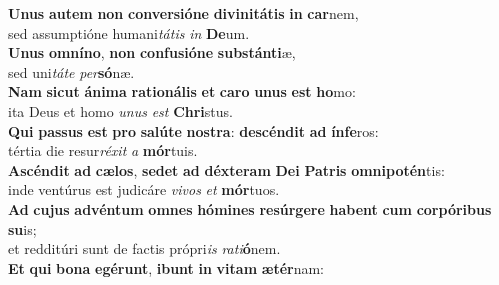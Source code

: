 \oddverse \textbf{U}\textbf{nus} \textbf{au}\textbf{tem} \textbf{non} \textbf{con}\textbf{ver}\textbf{si}\textbf{ó}\textbf{ne} \textbf{di}\textbf{vi}\textbf{ni}\textbf{tá}\textbf{tis} \textbf{in} \textbf{car}nem,~\*\\
\oddverse sed assumptióne humani\textit{tá}\textit{tis} \textit{in} \textbf{De}um.\\
\evenverse \textbf{U}\textbf{nus} \textbf{om}\textbf{ní}\textbf{no}, \textbf{non} \textbf{con}\textbf{fu}\textbf{si}\textbf{ó}\textbf{ne} \textbf{sub}\textbf{stán}\textbf{ti}æ,~\*\\
\evenverse sed uni\textit{tá}\textit{te} \textit{per}\textbf{só}næ.\\
\oddverse \textbf{Nam} \textbf{si}\textbf{cut} \textbf{á}\textbf{ni}\textbf{ma} \textbf{ra}\textbf{ti}\textbf{o}\textbf{ná}\textbf{lis} \textbf{et} \textbf{ca}\textbf{ro} \textbf{u}\textbf{nus} \textbf{est} \textbf{ho}mo:~\*\\
\oddverse ita Deus et homo \textit{u}\textit{nus} \textit{est} \textbf{Chri}stus.\\
\evenverse \textbf{Qui} \textbf{pas}\textbf{sus} \textbf{est} \textbf{pro} \textbf{sa}\textbf{lú}\textbf{te} \textbf{no}\textbf{stra}: \textbf{de}\textbf{scén}\textbf{dit} \textbf{ad} \textbf{ín}\textbf{fe}ros:~\*\\
\evenverse tértia die resur\textit{ré}\textit{xit} \textit{a} \textbf{mór}tuis.\\
\oddverse \textbf{A}\textbf{scén}\textbf{dit} \textbf{ad} \textbf{cæ}\textbf{los}, \textbf{se}\textbf{det} \textbf{ad} \textbf{déx}\textbf{te}\textbf{ram} \textbf{De}\textbf{i} \textbf{Pa}\textbf{tris} \textbf{om}\textbf{ni}\textbf{po}\textbf{tén}tis:~\*\\
\oddverse inde ventúrus est judicáre \textit{vi}\textit{vos} \textit{et} \textbf{mór}tuos.\\
\evenverse \textbf{Ad} \textbf{cu}\textbf{jus} \textbf{ad}\textbf{vén}\textbf{tum} \textbf{om}\textbf{nes} \textbf{hó}\textbf{mi}\textbf{nes} \textbf{re}\textbf{súr}\textbf{ge}\textbf{re} \textbf{ha}\textbf{bent} \textbf{cum} \textbf{cor}\textbf{pó}\textbf{ri}\textbf{bus} \textbf{su}is;~\*\\
\evenverse et redditúri sunt de factis própri\textit{is} \textit{ra}\textit{ti}\textbf{ó}nem.\\
\oddverse \textbf{Et} \textbf{qui} \textbf{bo}\textbf{na} \textbf{e}\textbf{gé}\textbf{runt}, \textbf{i}\textbf{bunt} \textbf{in} \textbf{vi}\textbf{tam} \textbf{æ}\textbf{tér}nam:~\*\\
